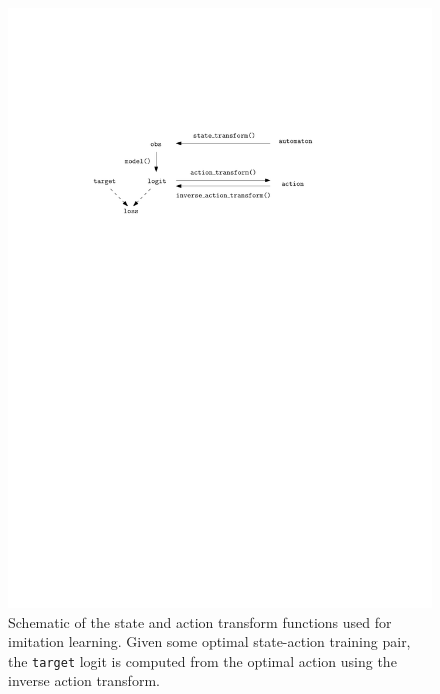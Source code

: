 \documentclass[a4paper]{article}
\theoremstyle{definition}
\theoremstyle{plain}
\begin{document}
\begin{figure}[h]
  \centering
  \includegraphics[scale=1]{figures/single/state_action_transforms}
  \caption{Schematic of the state and action transform functions used for
    imitation learning. Given some optimal state-action training pair, the
    \texttt{target} logit is computed from the optimal action using the inverse
    action transform.}
  \label{fig:state-action-transforms}
\end{figure}


\newpage
\end{document}
